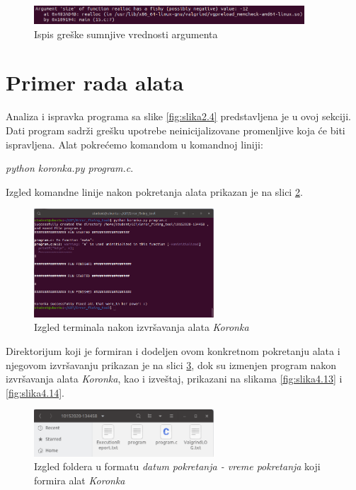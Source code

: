 \documentclass[12pt,oneside]{memoir}
\theoremstyle{plain}
\theoremstyle{definition}
\begin{document}
\begin{figure}[!ht]
  \centering
  \includegraphics[width=0.9\textwidth]{reallocFishyArgument.png}
  \caption{Ispis greške sumnjive vrednosti argumenta}
  \label{fig:slika4.10}
\end{figure} 

\section{Primer rada alata}
Analiza i ispravka programa sa slike \ref{fig:slika2.4} predstavljena je u ovoj sekciji. Dati program sadrži grešku upotrebe neinicijalizovane promenljive koja će biti ispravljena. Alat pokrećemo komandom u komandnoj liniji:
\begin{center}
\textit{python koronka.py program.c}.
\end{center}

Izgled komandne linije nakon pokretanja alata prikazan je na slici \ref{fig:slika4.11}. 
\begin{figure}[!ht]
  \centering
  \includegraphics[width=0.6\textwidth]{TerminalOutput.png}
  \caption{Izgled terminala nakon izvršavanja alata \textit{Koronka}}
  \label{fig:slika4.11}
\end{figure}

Direktorijum koji je formiran i dodeljen ovom konkretnom pokretanju alata i njegovom izvršavanju prikazan je na slici \ref{fig:slika4.12}, dok su izmenjen program nakon izvršavanja alata \textit{Koronka}, kao i izveštaj, prikazani na slikama \ref{fig:slika4.13} i \ref{fig:slika4.14}.
\begin{figure}[!ht]
  \centering
  \includegraphics[width=0.6\textwidth]{DateTimeFolder.png}
  \caption{Izgled foldera u formatu \textit{datum pokretanja - vreme pokretanja} koji formira alat \textit{Koronka}}
  \label{fig:slika4.12}
\end{figure}
\end{document}
